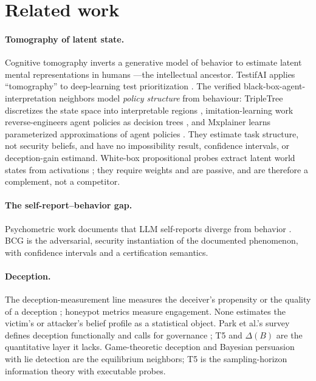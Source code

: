 \documentclass[acmsmall,review,anonymous]{acmart}
\begin{document}
\section{Related work}\label{sec:related}

\paragraph{Tomography of latent state.}
Cognitive tomography inverts a generative model of behavior to estimate latent
mental representations in humans \cite{houlsby2013}---the intellectual ancestor.
TestifAI applies ``tomography'' to deep-learning test prioritization
\cite{testifai}. The verified black-box-agent-interpretation neighbors model
\emph{policy structure} from behaviour: TripleTree discretizes the state space
into interpretable regions \cite{tripletree2020}, imitation-learning work
reverse-engineers agent policies as decision trees \cite{bewley2020}, and
Mxplainer learns parameterized approximations of agent policies
\cite{mxplainer2025}. They estimate task structure, not security beliefs, and
have no impossibility result, confidence intervals, or deception-gain estimand.
White-box propositional probes extract latent world states from activations
\cite{feng2024}; they require weights and are passive, and are therefore a
complement, not a competitor.

\paragraph{The self-report--behavior gap.}
Psychometric work documents that LLM self-reports diverge from behavior
\cite{shen2025,valuebench}. BCG is the adversarial, security instantiation of
the documented phenomenon, with confidence intervals and a certification
semantics.

\paragraph{Deception.}
The deception-measurement line measures the deceiver's propensity or the
quality of a deception \cite{decepeval,rowe2006}; honeypot metrics measure
engagement. None estimates the victim's or attacker's belief profile as a
statistical object. Park et al.'s survey defines deception functionally and
calls for governance \cite{park2024}; T5 and $\Delta(B)$ are the quantitative
layer it lacks. Game-theoretic deception \cite{nguyen2019} and Bayesian
persuasion with lie detection \cite{kamenica2011,nberlie} are the equilibrium
neighbors; T5 is the sampling-horizon information theory with executable probes.
\end{document}
